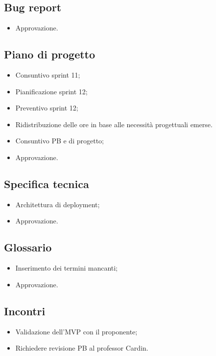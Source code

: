 \subsection{Bug report}
\begin{itemize}
    \item Approvazione.
\end{itemize}

\subsection{Piano di progetto}
\begin{itemize}
    \item Consuntivo sprint 11;
    \item Pianificazione sprint 12;
    \item Preventivo sprint 12;
    \item Ridistribuzione delle ore in base alle necessità progettuali emerse.
    \item Consuntivo PB e di progetto;
    \item Approvazione.
\end{itemize}

\subsection{Specifica tecnica}
\begin{itemize}
    \item Architettura di deployment;
    \item Approvazione.
\end{itemize}

\subsection{Glossario}
\begin{itemize}
    \item Inserimento dei termini mancanti;
    \item Approvazione.
\end{itemize}

\subsection{Incontri}
\begin{itemize}
    \item Validazione dell'MVP con il proponente;
    \item Richiedere revisione PB al professor Cardin.
\end{itemize}
